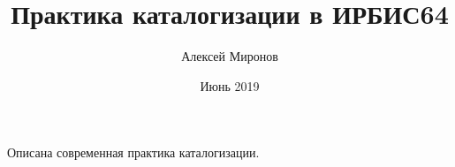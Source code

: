 \documentclass[a4paper,twoside,12pt]{book}
\begin{document}
\author{Алексей Миронов}
\title{Практика каталогизации в ИРБИС64}
\date{Июнь 2019}

\frontmatter
\maketitle

\clearpage
\thispagestyle{empty}
Описана современная практика каталогизации.

\mainmatter








\backmatter
\end{document}
